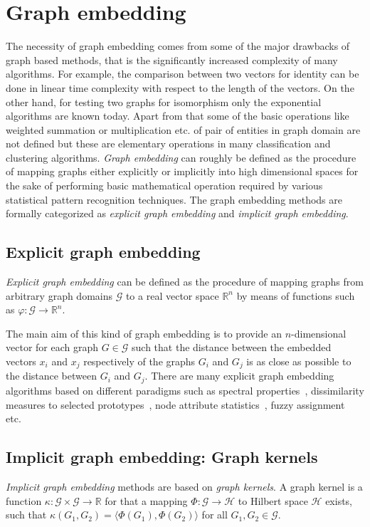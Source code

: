 \section{Graph embedding}
\label{sec:gm:ge}
The necessity of graph embedding comes from some of the major drawbacks of graph based methods, that is the significantly increased complexity of many algorithms. For example, the comparison between two vectors for identity can be done in linear time complexity with respect to the length of the vectors. On the other hand, for testing two graphs for isomorphism only the exponential algorithms are known today. Apart from that some of the basic operations like weighted summation or multiplication etc. of pair of entities in graph domain are not defined but these are elementary operations in many classification and clustering algorithms. \emph{Graph embedding} can roughly be defined as the procedure of mapping graphs either explicitly or implicitly into high dimensional spaces for the sake of performing basic mathematical operation required by various statistical pattern recognition techniques. The graph embedding methods are formally categorized as \emph{explicit graph embedding} and \emph{implicit graph embedding}.

\subsection{Explicit graph embedding}
\label{ssec:gm:ege}
\begin{definition}\emph{Explicit graph embedding} can be defined as the procedure of mapping graphs from arbitrary graph domains $\mathcal{G}$ to a real vector space $\mathbb{R}^n$ by means of functions such as $\varphi:\mathcal{G}\rightarrow \mathbb{R}^n$.
\end{definition}

The main aim of this kind of graph embedding is to provide an $n$-dimensional vector for each graph $G\in\mathcal{G}$ such that the distance between the embedded vectors $x_i$ and $x_j$ respectively of the graphs $G_i$ and $G_j$ is as close as possible to the distance between $G_i$ and $G_j$. There are many explicit graph embedding algorithms based on different paradigms such as spectral properties~\cite{Luo2003}, dissimilarity measures to selected prototypes~\cite{Bunke2010}, node attribute statistics~\cite{Gibert2012}, fuzzy assignment~\cite{Luqman2013} etc.

\subsection{Implicit graph embedding: Graph kernels}
\label{ssec:gm:ige}
\begin{definition}\emph{Implicit graph embedding} methods are based on \emph{graph kernels}. A graph kernel is a function $\kappa:\mathcal{G}\times\mathcal{G}\rightarrow\mathbb{R}$ for that a mapping $\Phi:\mathcal{G}\rightarrow\mathcal{H}$ to Hilbert space $\mathcal{H}$ exists, such that $\kappa(G_1,G_2)=\langle\Phi(G_1),\Phi(G_2)\rangle$ for all $G_1,G_2\in\mathcal{G}$.
\end{definition}

